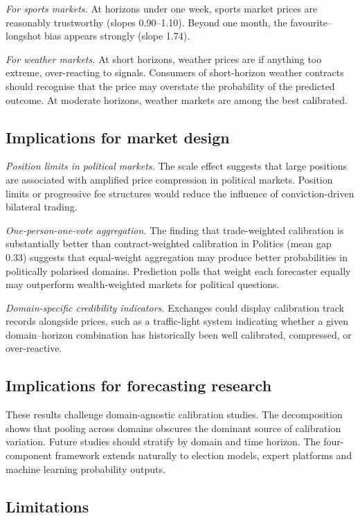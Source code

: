 \documentclass[numsec,webpdf,modern,medium]{oup-authoring-template}
\theoremstyle{thmstyleone}%
\theoremstyle{thmstyletwo}%
\theoremstyle{thmstylethree}%
\begin{document}
\emph{For sports markets.} At horizons under one week, sports market prices are reasonably trustworthy (slopes 0.90--1.10). Beyond one month, the favourite--longshot bias appears strongly (slope 1.74).

\emph{For weather markets.} At short horizons, weather prices are if anything too extreme, over-reacting to signals. Consumers of short-horizon weather contracts should recognise that the price may overstate the probability of the predicted outcome. At moderate horizons, weather markets are among the best calibrated.
\subsection{Implications for market design}\label{sec:design}

\emph{Position limits in political markets.} The scale effect suggests that large positions are associated with amplified price compression in political markets. Position limits or progressive fee structures would reduce the influence of conviction-driven bilateral trading.

\emph{One-person-one-vote aggregation.} The finding that trade-weighted calibration is substantially better than contract-weighted calibration in Politics (mean gap 0.33) suggests that equal-weight aggregation may produce better probabilities in politically polarised domains. Prediction polls \citep{atanasov2017distilling,pennock2001real} that weight each forecaster equally may outperform wealth-weighted markets for political questions.

\emph{Domain-specific credibility indicators.} Exchanges could display calibration track records alongside prices, such as a traffic-light system indicating whether a given domain--horizon combination has historically been well calibrated, compressed, or over-reactive.
\subsection{Implications for forecasting research}\label{sec:research}

These results challenge domain-agnostic calibration studies. The decomposition shows that pooling across domains obscures the dominant source of calibration variation. Future studies should stratify by domain and time horizon. The four-component framework extends naturally to election models, expert platforms and machine learning probability outputs.
\subsection{Limitations}\label{sec:limitations}
\end{document}
